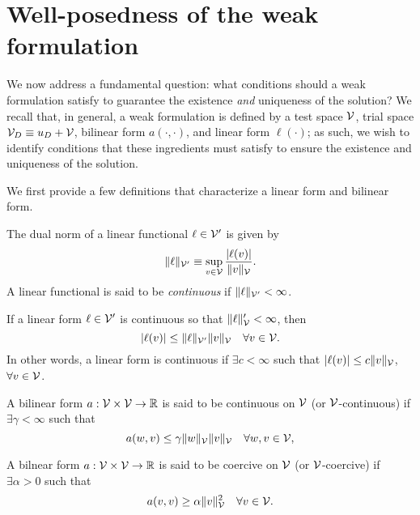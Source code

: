 \section{Well-posedness of the weak formulation}
We now address a fundamental question: what conditions should a weak formulation satisfy to guarantee the existence \emph{and} uniqueness of the solution?  We recall that, in general, a weak formulation is defined by a test space $\mathcal{V}$, trial space $\mathcal{V}_D \equiv u_D + \mathcal{V}$, bilinear form $a(\cdot,\cdot)$, and linear form $\ell(\cdot)$; as such, we wish to identify conditions that these ingredients must satisfy to ensure the existence and uniqueness of the solution.

We first provide a few definitions that characterize a linear form and bilinear form.
\begin{definition}
  The dual norm of a linear functional $\ell \in \mathcal{V}'$ is given by
  \begin{equation*}
    \| \ell \|_{\mathcal{V}'} \equiv \sup_{v \in \mathcal{V}} \frac{|\ell(v)|}{\| v \|_{\mathcal{V}}}.
  \end{equation*}
  A linear functional is said to be \emph{continuous} if $\| \ell \|_{\mathcal{V}'} < \infty$.
\end{definition}
\begin{corollary}
  If a linear form $\ell \in \mathcal{V}'$ is continuous so that $\| \ell \|_{\mathcal{V}}' < \infty$, then
  \begin{equation*}
    |\ell(v)| \leq \| \ell \|_{\mathcal{V}'} \| v \|_{\mathcal{V}} \quad \forall v \in \mathcal{V}.
  \end{equation*}
  In other words, a linear form is continuous if $\exists c < \infty$ such that $| \ell(v) | \leq c \| v \|_{\mathcal{V}}$, $\forall v \in \mathcal{V}$.
\end{corollary}
\begin{definition}[continuity]
  \label{def:th_continuity}
  A bilinear form $a: \mathcal{V} \times \mathcal{V} \to \mathbb{R}$ is said to be continuous on $\mathcal{V}$ (or $\mathcal{V}$-continuous) if $\exists \gamma < \infty$ such that 
  \begin{equation*}
    a(w,v) \leq \gamma \| w \|_{\mathcal{V}} \| v \|_{\mathcal{V}} \quad \forall w,v \in \mathcal{V},
  \end{equation*}
\end{definition}
\begin{definition}[coercivity]
  \label{def:th_coercivity}
  A bilnear form $a: \mathcal{V} \times \mathcal{V} \to \mathbb{R}$ is said to be coercive on $\mathcal{V}$ (or $\mathcal{V}$-coercive) if $\exists \alpha > 0$ such that 
  \begin{equation*}
    a(v,v) \geq \alpha \| v \|_{\mathcal{V}}^2 \quad \forall v \in \mathcal{V}.
  \end{equation*}
\end{definition}
